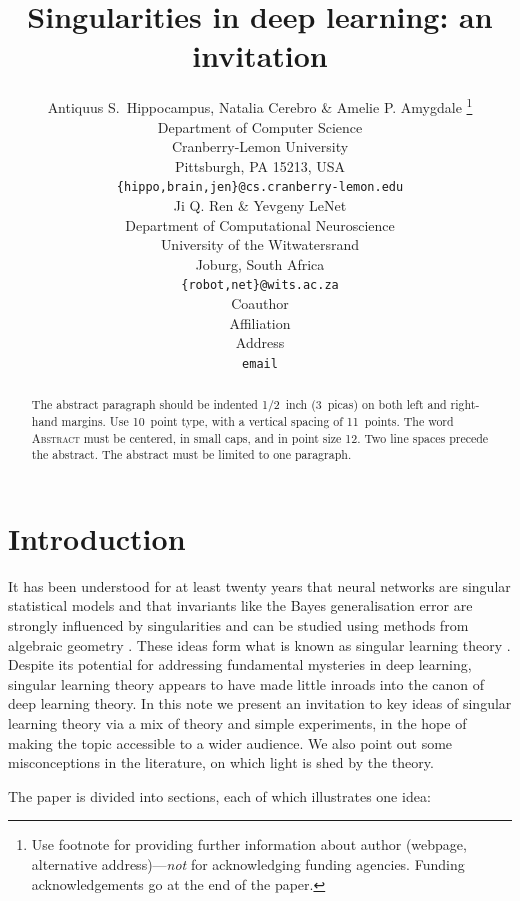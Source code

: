\documentclass{article} %
\title{Singularities in deep learning: an invitation}
\author{Antiquus S.~Hippocampus, Natalia Cerebro \& Amelie P. Amygdale \thanks{ Use footnote for providing further information
about author (webpage, alternative address)---\emph{not} for acknowledging
funding agencies.  Funding acknowledgements go at the end of the paper.} \\
Department of Computer Science\\
Cranberry-Lemon University\\
Pittsburgh, PA 15213, USA \\
\texttt{\{hippo,brain,jen\}@cs.cranberry-lemon.edu} \\
\And
Ji Q. Ren \& Yevgeny LeNet \\
Department of Computational Neuroscience \\
University of the Witwatersrand \\
Joburg, South Africa \\
\texttt{\{robot,net\}@wits.ac.za} \\
\AND
Coauthor \\
Affiliation \\
Address \\
\texttt{email}
}
\begin{document}
\maketitle

\begin{abstract}
The abstract paragraph should be indented 1/2~inch (3~picas) on both left and
right-hand margins. Use 10~point type, with a vertical spacing of 11~points.
The word \textsc{Abstract} must be centered, in small caps, and in point size 12. Two
line spaces precede the abstract. The abstract must be limited to one
paragraph.
\end{abstract}

\section{Introduction}

It has been understood for at least twenty years that neural networks are singular statistical models \cite{??} and that invariants like the Bayes generalisation error are strongly influenced by singularities and can be studied using methods from algebraic geometry \cite{??}. These ideas form what is known as singular learning theory \citep{watanabe_algebraic_2009}.
Despite its potential for addressing fundamental mysteries in deep learning, singular learning theory appears to have made little inroads into the canon of deep learning theory. In this note we present an invitation to key ideas of singular learning theory via a mix of theory and simple experiments, in the hope of making the topic accessible to a wider audience. We also point out some misconceptions in the literature, on which light is shed by the theory.


The paper is divided into sections, each of which illustrates one idea:
\end{document}
